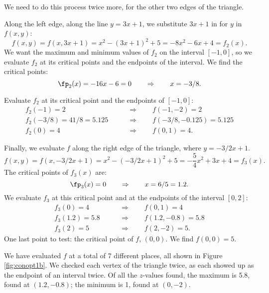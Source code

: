 {We need to do this process twice more, for the other two edges of the triangle.

Along the left edge, along the line $y=3x+1$, we substitute $3x+1$ in for $y$ in $f(x,y)$:
$$f(x,y) = f(x,3x+1) = x^2-(3x+1)^2+5 = -8x^2-6x+4 = f_2(x).$$
We want the maximum and minimum values of $f_2$ on the interval $[-1,0]$, so we evaluate $f_2$ at its critical points and the endpoints of the interval. We find the critical points:
$$\fp_2(x) = -16x-6=0 \qquad \Rightarrow \qquad x=-3/8.$$

Evaluate $f_2$ at its critical point and the endpoints of $[-1,0]$:
\begin{align*}
f_2(-1) = 2 \qquad&\Rightarrow\qquad f(-1,-2) = 2\\
f_2(-3/8) = 41/8=5.125  \qquad&\Rightarrow \qquad f(-3/8,-0.125) = 5.125\\
f_2(0) = 4 \qquad&\Rightarrow \qquad f(0,1) = 4.
\end{align*}

Finally, we evaluate $f$ along the right edge of the triangle, where $y = -3/2x+1$. 
$$f(x,y) = f(x,-3/2x+1) = x^2-(-3/2x+1)^2+5 = -\frac54x^2+3x+4=f_3(x).$$
The critical points of $f_3(x)$ are:
$$\fp_3(x) = 0 \qquad \Rightarrow \qquad x=6/5=1.2.$$
We evaluate $f_3$ at this critical point and at the endpoints of the interval $[0,2]$:
\begin{align*}
f_3(0) = 4 \qquad&\Rightarrow\qquad f(0,1) = 4\\
f_3(1.2) = 5.8  \qquad&\Rightarrow \qquad f(1.2,-0.8) = 5.8\\
f_3(2) = 5 \qquad&\Rightarrow \qquad f(2,-2) = 5.
\end{align*}
One last point to test: the critical point of $f$, $(0,0)$. We find $f(0,0) = 5$.

We have evaluated $f$ at a total of 7 different places, all shown in Figure \ref{fig:conopt1b}. We checked each vertex of the triangle twice, as each showed up as the endpoint of an interval twice. Of all the $z$-values found, the maximum is 5.8, found at $(1.2,-0.8)$; the minimum is 1, found at $(0,-2)$. 
}\\

